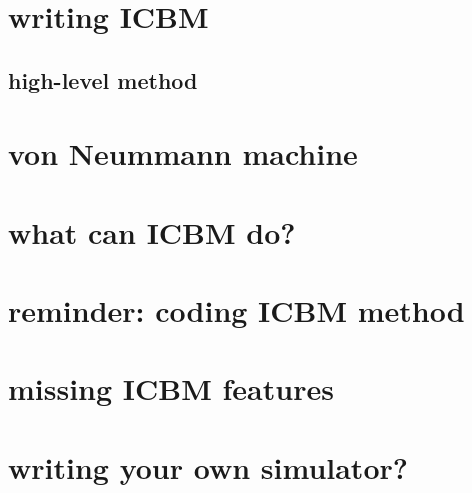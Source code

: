 \section{writing ICBM}

\subsection{high-level method}




\section{von Neummann machine}



\section{what can ICBM do?}




\section{reminder: coding ICBM method}






\section{missing ICBM features}



\section{writing your own simulator?}




